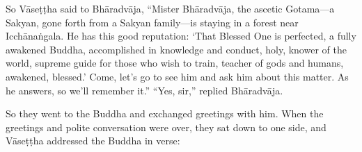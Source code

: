 \documentclass[12pt,openany]{book}%
\begin{document}
So \textsanskrit{Vāseṭṭha} said to \textsanskrit{Bhāradvāja}, “Mister \textsanskrit{Bhāradvāja}, the ascetic Gotama—a Sakyan, gone forth from a Sakyan family—is staying in a forest near \textsanskrit{Icchānaṅgala}. He has this good reputation: ‘That Blessed One is perfected, a fully awakened Buddha, accomplished in knowledge and conduct, holy, knower of the world, supreme guide for those who wish to train, teacher of gods and humans, awakened, blessed.’ Come, let’s go to see him and ask him about this matter. As he answers, so we’ll remember it.” “Yes, sir,” replied \textsanskrit{Bhāradvāja}. 

So they went to the Buddha and exchanged greetings with him. When the greetings and polite conversation were over, they sat down to one side, and \textsanskrit{Vāseṭṭha} addressed the Buddha in verse: 
\end{document}
